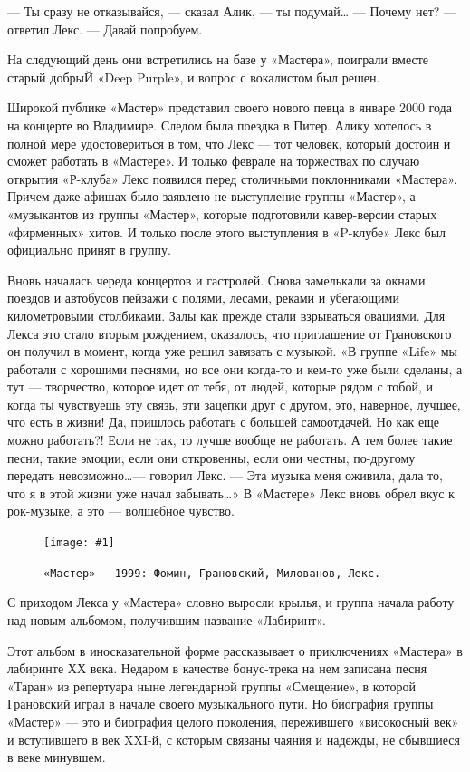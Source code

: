 \documentclass[10pt, twoside]{book}
\newcommand{\myincludegraphics}[1]{\texttt{[image: \#1]}}
\begin{document}
— Ты сразу не отказывайся, — сказал Алик, — ты подумай\ldots
— Почему нет? — ответил Лекс. — Давай попробуем.

На следующий день они встретились на базе у «Мастера», поиграли вместе старый добрыЙ «Deep Purple», и вопрос с
вокалистом был решен.

Широкой публике «Мастер» представил своего нового певца в январе 2000 года на концерте во Владимире. Следом была поездка
в Питер. Алику хотелось в полной мере удостовериться в том, что Лекс — тот человек, который достоин и сможет работать в
«Мастере». И только феврале на торжествах по случаю открытия «Р-клуба» Лекс появился перед столичными поклонниками
«Мастера». Причем даже афишах было заявлено не выступление группы «Мастер», а «музыкантов из группы «Мастер», которые
подготовили кавер-версии старых «фирменных» хитов. И только после этого выступления в «P-клубе» Лекс был официально
принят в группу.

Вновь началась череда концертов и гастролей. Снова замелькали за окнами поездов и автобусов пейзажи с полями, лесами,
реками и убегающими километровыми столбиками. Залы как прежде стали взрываться овациями. Для Лекса это стало вторым
рождением, оказалось, что приглашение от Грановского он получил в момент, когда уже решил завязать с музыкой. «В группе
«Life» мы работали с хорошими песнями, но все они когда-то и кем-то уже были сделаны, а тут — творчество, которое идет
от тебя, от людей, которые рядом с тобой, и когда ты чувствуешь эту связь, эти зацепки друг с другом, это, наверное,
лучшее, что есть в жизни! Да, пришлось работать с большей самоотдачей. Но как еще можно работать?! Если не так, то лучше
вообще не работать. А тем более такие песни, такие эмоции, если они откровенны, если они честны, по-другому передать
невозможно\ldots — говорил Лекс. — Эта музыка меня оживила, дала то, что я в этой жизни уже начал забывать\ldots» В
«Мастере» Лекс вновь обрел вкус к рок-музыке, а это — волшебное чувство.

\begin{figure}[h]
    \centering
    \myincludegraphics{Image33}
    \caption{\texttt{«Мастер» - 1999: Фомин, Грановский, Милованов, Лекс.}}
\end{figure}

С приходом Лекса у «Мастера» словно выросли крылья, и группа начала работу над новым альбомом, получившим название
«Лабиринт».

Этот альбом в иносказательной форме рассказывает о приключениях «Мастера» в лабиринте ХХ века. Недаром в качестве
бонус-трека на нем записана песня «Таран» из репертуара ныне легендарной группы «Смещение», в которой Грановский играл в
начале своего музыкального пути. Но биография группы «Мастер» — это и биография целого поколения, пережившего
«високосный век» и вступившего в век XXI-й, с которым связаны чаяния и надежды, не сбывшиеся в веке минувшем.
\end{document}
